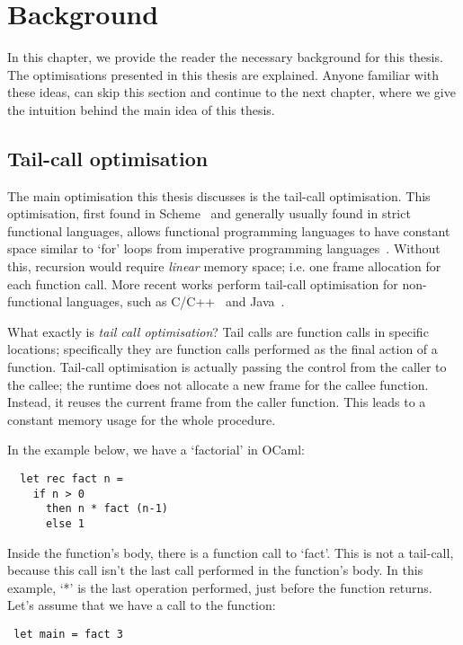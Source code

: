 \documentclass[diploma]{softlab-thesis}
\begin{document}
\chapter{Background}
\label{ch:background}

In this chapter, we provide the reader the necessary background for this thesis. The optimisations presented in this thesis 
are explained. Anyone familiar with these ideas, can skip this section and continue to the next chapter, where we give the intuition behind the
main idea of this thesis.

\section{Tail-call optimisation}
\label{sec:tco}

The main optimisation this thesis discusses is the tail-call optimisation. This optimisation, first found in Scheme~\cite{Sussman:1975:IEL:889230,Steele:1976:LUI:889232} and
generally usually found in strict functional languages, 
allows functional programming languages to have constant space 
similar to `for' loops from imperative programming languages~\cite{Clinger:1998:PTR:277650.277719}. 
Without this, recursion would require \textit{linear} memory space; 
i.e. one frame allocation for each function call. More recent works perform tail-call optimisation 
for non-functional languages, such as C/C++~\cite{Probst01} 
and Java~\cite{Madsen:2018:TCE:3178372.3179499}.

What exactly is \textit{tail call optimisation}? Tail calls are function calls in specific locations;
specifically they are function calls performed as the final action of a function. Tail-call optimisation is actually passing 
the control from the caller to the callee; the runtime does not allocate a new frame for the 
callee function. Instead, it reuses the current frame from the caller function. This leads to 
a constant memory usage for the whole procedure. 

In the example below, we have a `factorial' in OCaml:
\begin{verbatim}
  let rec fact n = 
    if n > 0 
      then n * fact (n-1)
      else 1
\end{verbatim}

Inside the function's body, there is a function call to `fact'. This is not a tail-call, because this call isn't 
the last call performed in the function's body. In this example, `*' is the last operation performed, just before the function returns.
Let's assume that we have a call to the function:
\begin{verbatim}
 let main = fact 3
\end{verbatim}
\end{document}
